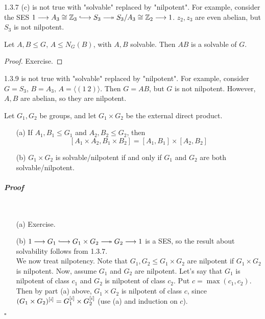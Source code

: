 \documentclass[11pt]{book}
\theoremstyle{definition}   \newtheorem{defn}[counter]{Definition} %
\newcommand{\gen}[1]{\langle #1 \rangle}   \newcommand{\stab}[2]{\tn{Stab}_{#1}(#2)}   \newcommand{\fix}[2]{\tn{Fix}_{#1}(#2)}
\newcommand{\hooklongrightarrow}{\lhook\joinrel\longrightarrow}   \newcommand{\twoheadlongrightarrow}{\relbar\joinrel\twoheadrightarrow}
\newcommand{\ses}[5]{1 \longrightarrow #1 \overset{#2}{\hooklongrightarrow} #3 \overset{#4}{\twoheadlongrightarrow} #5 \longrightarrow 1}
\newenvironment{prf}{\paragraph{\textit{Proof}}}{\hfill$\square$}
\newcommand{\vs}{\vspace{8pt}}
\numberwithin{counter}{chapter}
\begin{document}
\vs

\begin{remark}
1.3.7 (c) is not true with "solvable" replaced by "nilpotent". For example, consider the SES $\ses{A_3 \cong \z_3}{}{S_3}{}{S_3/A_3 \cong \z_2}$. $z_2,z_3$ are even abelian, but $S_3$ is not nilpotent.
\end{remark}

\vs

\begin{corollary}
Let $A,B \leq G$, $A \leq N_G(B)$, with $A,B$ solvable. Then $AB$ is a solvable of $G$.
\end{corollary}

\begin{proof}
Exercise.
\end{proof}

\vs

\begin{remark*}
1.3.9 is not true with "solvable" replaced by "nilpotent". For example, consider $G = S_3$, $B = A_3$, $A = \gen{(1\ 2)}$. Then $G = AB$, but $G$ is not nilpotent. However, $A,B$ are abelian, so they are nilpotent.
\end{remark*}

\vs

\begin{lemma}
Let $G_1, G_2$ be groups, and let $G_1 \times G_2$ be the external direct product.
	\begin{enumerate}
	\item[(a)] If $A_1, B_1 \leq G_1$ and $A_2, B_2 \leq G_2$, then
		\[[A_1\times A_2, B_1 \times B_2] = [A_1,B_1] \times [A_2,B_2] \]
	\item[(b)] $G_1 \times G_2$ is solvable/nilpotent if and only if $G_1$ and $G_2$ are both solvable/nilpotent.
	\end{enumerate}
\end{lemma}

\begin{prf}\
\begin{enumerate}
\item[(a)] Exercise.
\item[(b)] $\ses{G_1}{}{G_1\times G_2}{}{G_2}$ is a SES, so the result about solvability follows from 1.3.7. \\

We now treat nilpotency. Note that $G_1, G_2 \leq G_1 \times G_2$ are nilpotent if $G_1 \times G_2$ is nilpotent. Now, assume $G_1$ and $G_2$ are nilpotent. Let's say that $G_1$ is nilpotent of class $c_1$ and $G_2$ is nilpotent of class $c_2$. Put $c = \max(c_1,c_2)$. Then by part (a) above, $G_1 \times G_2$ is nilpotent of class $c$, since $(G_1 \times G_2)^{[i]} = G_1^{[i]} \times G_2^{[i]}$ (use (a) and induction on $c$).
\end{enumerate}
\end{prf}
\end{document}
